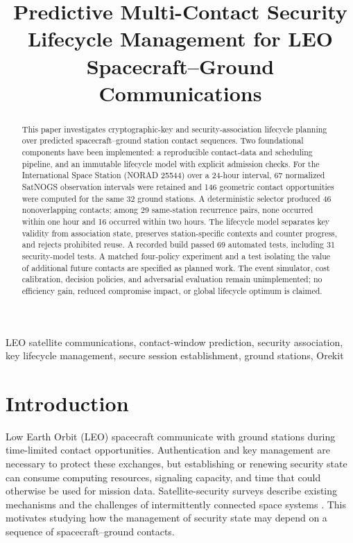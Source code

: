 \documentclass[conference]{IEEEtran}
\begin{document}
\title{Predictive Multi-Contact Security Lifecycle Management for LEO Spacecraft--Ground Communications}
\author{}
\maketitle

\begin{abstract}
This paper investigates cryptographic-key and security-association lifecycle planning over predicted spacecraft--ground station contact sequences. Two foundational components have been implemented: a reproducible contact-data and scheduling pipeline, and an immutable lifecycle model with explicit admission checks. For the International Space Station (NORAD 25544) over a 24-hour interval, 67 normalized SatNOGS observation intervals were retained and 146 geometric contact opportunities were computed for the same 32 ground stations. A deterministic selector produced 46 nonoverlapping contacts; among 29 same-station recurrence pairs, none occurred within one hour and 16 occurred within two hours. The lifecycle model separates key validity from association state, preserves station-specific contexts and counter progress, and rejects prohibited reuse. A recorded build passed 69 automated tests, including 31 security-model tests. A matched four-policy experiment and a test isolating the value of additional future contacts are specified as planned work. The event simulator, cost calibration, decision policies, and adversarial evaluation remain unimplemented; no efficiency gain, reduced compromise impact, or global lifecycle optimum is claimed.
\end{abstract}

\begin{IEEEkeywords}
LEO satellite communications, contact-window prediction, security association, key lifecycle management, secure session establishment, ground stations, Orekit
\end{IEEEkeywords}

\section{Introduction}
Low Earth Orbit (LEO) spacecraft communicate with ground stations during time-limited contact opportunities. Authentication and key management are necessary to protect these exchanges, but establishing or renewing security state can consume computing resources, signaling capacity, and time that could otherwise be used for mission data. Satellite-security surveys describe existing mechanisms and the challenges of intermittently connected space systems \cite{ref1}. This motivates studying how the management of security state may depend on a sequence of spacecraft--ground contacts.
\end{document}
